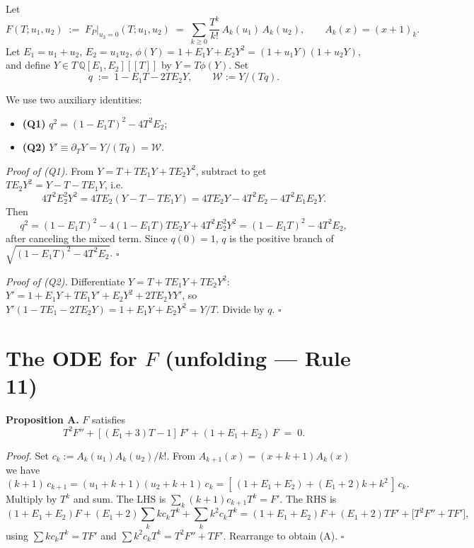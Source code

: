\documentclass[11pt]{article}
\newcommand{\W}{\mathcal{W}}
\begin{document}
Let
$$F(T; u_1, u_2) \;:=\; F_P\big|_{u_3=0}(T;u_1,u_2) \;=\; \sum_{k\ge 0}\frac{T^k}{k!}\,A_k(u_1)\,A_k(u_2), \qquad A_k(x) = (x+1)_k.$$
Let $E_1 = u_1 + u_2$, $E_2 = u_1 u_2$, $\phi(Y) = 1 + E_1 Y + E_2 Y^2 = (1 + u_1 Y)(1 + u_2 Y)$, and define $Y \in T\,\mathbb Q[E_1, E_2][[T]]$ by $Y = T\phi(Y)$. Set
$$q \;:=\; 1 - E_1 T - 2 T E_2 Y, \qquad \W := Y/(Tq).$$

We use two auxiliary identities:

\begin{itemize}
  \item \textbf{(Q1)} $q^2 = (1 - E_1 T)^2 - 4 T^2 E_2$;
  \item \textbf{(Q2)} $Y' \equiv \partial_T Y = Y/(Tq) = \W$.
\end{itemize}

\emph{Proof of (Q1).} From $Y = T + T E_1 Y + T E_2 Y^2$, subtract to get $T E_2 Y^2 = Y - T - T E_1 Y$, i.e.
$$4 T^2 E_2^2 Y^2 = 4 T E_2 (Y - T - T E_1 Y) = 4 T E_2 Y - 4 T^2 E_2 - 4 T^2 E_1 E_2 Y.$$
Then
$$q^2 = (1 - E_1 T)^2 - 4(1 - E_1 T)T E_2 Y + 4 T^2 E_2^2 Y^2 = (1 - E_1 T)^2 - 4 T^2 E_2,$$
after canceling the mixed term. Since $q(0) = 1$, $q$ is the positive branch of $\sqrt{(1-E_1 T)^2 - 4 T^2 E_2}$. $\square$

\emph{Proof of (Q2).} Differentiate $Y = T + T E_1 Y + T E_2 Y^2$: $Y' = 1 + E_1 Y + T E_1 Y' + E_2 Y^2 + 2 T E_2 Y Y'$, so $Y'(1 - T E_1 - 2 T E_2 Y) = 1 + E_1 Y + E_2 Y^2 = Y/T$. Divide by $q$. $\square$

\section{The ODE for $F$ (unfolding --- Rule 11)}

\noindent\textbf{Proposition A.} $F$ satisfies
\begin{equation}\tag{A}
T^2 F'' + [(E_1 + 3) T - 1]\,F' + (1 + E_1 + E_2)\,F \;=\; 0.
\end{equation}

\emph{Proof.} Set $c_k := A_k(u_1) A_k(u_2)/k!$. From $A_{k+1}(x) = (x + k + 1) A_k(x)$ we have
$$(k+1)\,c_{k+1} = (u_1 + k + 1)(u_2 + k + 1)\,c_k = [\,(1 + E_1 + E_2) + (E_1 + 2)k + k^2\,]\,c_k.$$
Multiply by $T^k$ and sum. The LHS is $\sum_k (k+1) c_{k+1} T^k = F'$. The RHS is
$$(1 + E_1 + E_2) F + (E_1 + 2)\sum_k k c_k T^k + \sum_k k^2 c_k T^k = (1+E_1+E_2) F + (E_1+2) T F' + \big[T^2 F'' + T F'\big],$$
using $\sum k c_k T^k = T F'$ and $\sum k^2 c_k T^k = T^2 F'' + T F'$. Rearrange to obtain (A). $\square$
\end{document}
